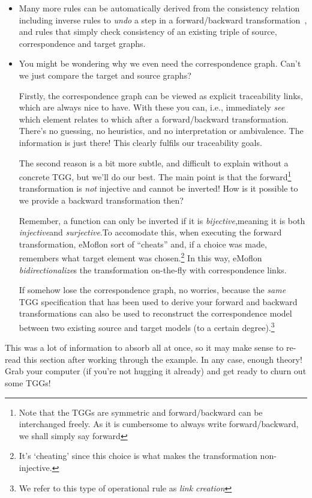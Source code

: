\begin{itemize}

\item Many more rules can be automatically derived from the consistency relation including inverse rules to \emph{undo} a step in a forward/backward
transformation~\cite{LAVS_ICGT_2012}, and rules that simply check consistency of an existing triple of source, correspondence and target graphs. \update

\item You might be wondering why we even need the correspondence graph. Can't we just compare the target and source graphs? 

Firstly, the correspondence graph can be viewed as explicit traceability links, which are always nice to have. With these you can, i.e., immediately \emph{see}
which element relates to which after a forward/backward transformation. There's no guessing, no heuristics, and no interpretation or ambivalence. The
information is just there! This clearly fulfils our traceability goals.

The second reason is a bit more subtle, and difficult to explain without a concrete TGG, but we'll do our best. The main point is that the forward\footnote{Note
that the TGGs are symmetric and forward/backward can be interchanged freely.  As it is cumbersome to always write forward/backward, we shall simply say
forward} transformation is \emph{not} injective and cannot be inverted! How is it possible to we provide a backward transformation then?

Remember, a function can only be inverted if it is \emph{bijective},meaning it is both \emph{injective}and
\emph{surjective}.To accomodate this, when executing the forward transformation, eMoflon sort of ``cheats'' and, if a choice was made, 
remembers what target element was chosen.\footnote{It's `cheating' since this choice is what makes the transformation non-injective.} In this way, eMoflon
\emph{bidirectionalize}s the transformation on-the-fly with correspondence links.

If somehow lose the correspondence graph, no worries, because the \emph{same} TGG specification that has been used to derive your forward and backward
transformations can also be used to reconstruct the correspondence model between two existing source and target models (to a certain degree).\footnote{We refer
to this type of operational rule as \emph{link creation}}

\end{itemize}
This was a lot of information to absorb all at once, so it may make sense to re-read this section after working through the example. In any case, enough theory!
Grab your computer (if you're not hugging it already) and get ready to churn out some TGGs!
